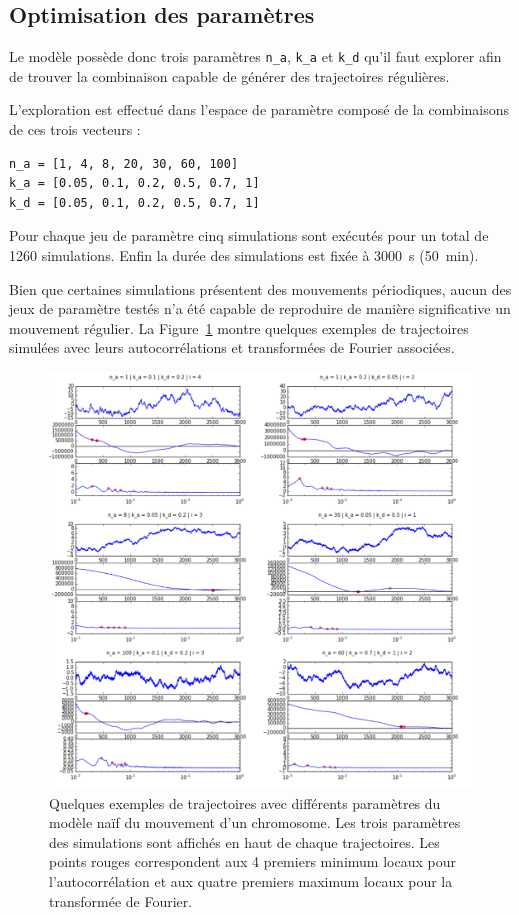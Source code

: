 \documentclass[12pt,a4paper,twoside,openright]{book}
\begin{document}
\subsection{Optimisation des
paramètres}\label{optimisation-des-paramuxe8tres}

Le modèle possède donc trois paramètres \texttt{n\_a}, \texttt{k\_a} et
\texttt{k\_d} qu'il faut explorer afin de trouver la combinaison capable
de générer des trajectoires régulières.

L'exploration est effectué dans l'espace de paramètre composé de la
combinaisons de ces trois vecteurs :

\begin{verbatim}
n_a = [1, 4, 8, 20, 30, 60, 100]
k_a = [0.05, 0.1, 0.2, 0.5, 0.7, 1]
k_d = [0.05, 0.1, 0.2, 0.5, 0.7, 1]
\end{verbatim}

Pour chaque jeu de paramètre cinq simulations sont exécutés pour un
total de 1260 simulations. Enfin la durée des simulations est fixée à
3000~s (50~min).

Bien que certaines simulations présentent des mouvements périodiques,
aucun des jeux de paramètre testés n'a été capable de reproduire de
manière significative un mouvement régulier. La
Figure~\ref{fig:simu-oscill-all} montre quelques exemples de
trajectoires simulées avec leurs autocorrélations et transformées de
Fourier associées.

\begin{figure}[htbp]
\centering
\includegraphics{figures/annexes/simu_oscill_all.png}
\caption[Quelques exemples de trajectoires avec différents paramètres du modèle naïf du mouvement d'un chromosome]{\label{fig:simu-oscill-all}Quelques
exemples de trajectoires avec différents paramètres du modèle naïf du
mouvement d'un chromosome. Les trois paramètres des simulations sont
affichés en haut de chaque trajectoires. Les points rouges correspondent
aux 4 premiers minimum locaux pour l'autocorrélation et aux quatre
premiers maximum locaux pour la transformée de Fourier.}
\end{figure}
\end{document}
